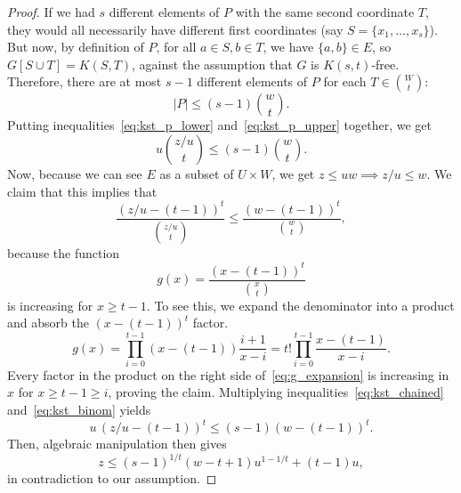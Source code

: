 \begin{theorem}
\begin{proof}
        If we had $s$ different elements of $P$ with the same second coordinate $T$,
        they would all necessarily have different first coordinates
        (say $S = \{x_1, \dots, x_s\}$).
        But now, by definition of $P$, for all $a \in S, b \in T$, we have $\{a, b\} \in E$,
        so $G[S \cup T] = K(S, T)$, against the assumption that $G$ is $K(s, t)$-free.
        Therefore, there are at most $s - 1$ different elements of $P$ for each $T \in \binom{W}{t}$:
        \begin{equation} \label{eq:kst_p_upper}
            |P| \leq (s - 1) \binom{w}{t}.
        \end{equation}
        Putting inequalities~\eqref{eq:kst_p_lower} and~\eqref{eq:kst_p_upper}
        together, we get
        \begin{equation} \label{eq:kst_chained}
            u \binom{z / u}{t} \leq (s - 1) \binom{w}{t}.
        \end{equation}
        Now, because we can see $E$ as a subset of $U \times W$,
        we get $z \leq uw \implies z/u \leq w$.
        We claim that this implies that
        \begin{equation} \label{eq:kst_binom}
            \frac{(z/u - (t - 1))^t}{\binom{z/u}{t}} \leq \frac{(w - (t - 1))^t}{\binom{w}{t}},
        \end{equation}
        because the function
        \[
            g(x) = \frac{(x - (t - 1))^t}{\binom{x}{t}}
        \]
        is increasing for $x \geq t - 1$.
        To see this, we expand the denominator into a product and absorb the $(x - (t - 1))^t$ factor.
        \begin{equation} \label{eq:g_expansion}
            g(x) = \prod_{i=0}^{t-1} (x-(t-1)) \frac{i+1}{x-i} = t! \prod_{i=0}^{t-1} \frac{x-(t-1)}{x-i}.
        \end{equation}
        Every factor in the product on the right side of~\eqref{eq:g_expansion} is increasing
        in $x$ for $x \geq t - 1 \geq i$, proving the claim.
        Multiplying inequalities~\eqref{eq:kst_chained} and~\eqref{eq:kst_binom} yields
        \[
            u \, (z/u - (t - 1))^t \leq (s - 1)(w - (t - 1))^t.
        \]
        Then, algebraic manipulation then gives
        \[
            z \leq (s - 1)^{1 / t}(w - t + 1)u^{1 - 1 / t} + (t - 1)u,
        \]
        in contradiction to our assumption. \qedhere
    \end{proof}

\end{theorem}

